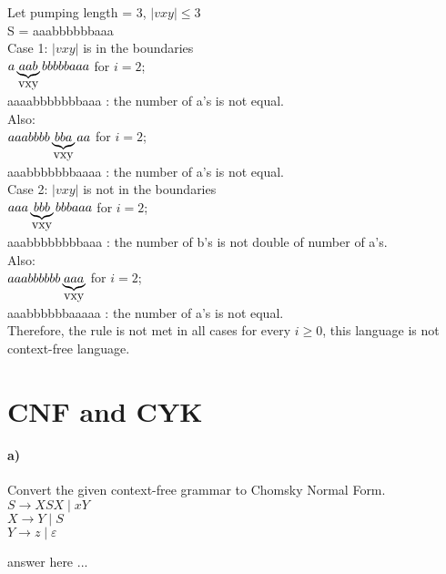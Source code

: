 \documentclass[a4paper,12pt]{article}
\begin{document}
\begin{tcolorbox}
Let pumping length = 3, $|vxy| \le 3 $\\
S = aaabbbbbbaaa\\

Case 1: $|vxy|$ is in the boundaries\\
$a\underbrace{\hbox{$aab$}}_{\hbox{vxy}}bbbbbaaa$ for $i=2$; \\
aaaabbbbbbbaaa : the number of a's is not equal.\\
Also: \\
$aaabbbb\underbrace{\hbox{$bba$}}_{\hbox{vxy}}aa$ for $i=2$; \\
aaabbbbbbbaaaa : the number of a's is not equal.\\

Case 2: $|vxy|$ is not in the boundaries\\
$aaa\underbrace{\hbox{$bbb$}}_{\hbox{vxy}}bbbaaa$ for $i=2$; \\
aaabbbbbbbbaaa : the number of b's is not double of number of a's.\\
Also: \\
$aaabbbbbb\underbrace{\hbox{$aaa$}}_{\hbox{vxy}}$ for $i=2$; \\
aaabbbbbbaaaaa : the number of a's is not equal.\\

Therefore, the rule is not met in all cases for every $i \ge 0$, this language is not context-free language. 
\end{tcolorbox}





\newpage
\section{CNF and CYK \hfill {}}

\paragraph{a)} Convert the given context-free grammar to Chomsky Normal Form. \\

$ S   \to XSX \mid xY $ \\
$ X   \to Y \mid S $ \\
$ Y   \to z \mid \varepsilon $ \\

\begin{tcolorbox}
answer here ...
\vspace{18cm} %
\end{tcolorbox}
\end{document}
